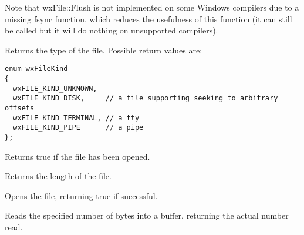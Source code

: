 Note that wxFile::Flush is not implemented on some Windows compilers
due to a missing fsync function, which reduces the usefulness of this function
(it can still be called but it will do nothing on unsupported compilers).

\label{wxfilegetfilekind}


Returns the type of the file. Possible return values are:

\begin{verbatim}
enum wxFileKind
{
  wxFILE_KIND_UNKNOWN,
  wxFILE_KIND_DISK,     // a file supporting seeking to arbitrary offsets
  wxFILE_KIND_TERMINAL, // a tty
  wxFILE_KIND_PIPE      // a pipe
};

\end{verbatim}

\label{wxfileisopened}


Returns true if the file has been opened.

\label{wxfilelength}


Returns the length of the file.

\label{wxfileopen}


Opens the file, returning true if successful.




\label{wxfileread}


Reads the specified number of bytes into a buffer, returning the actual number read.




